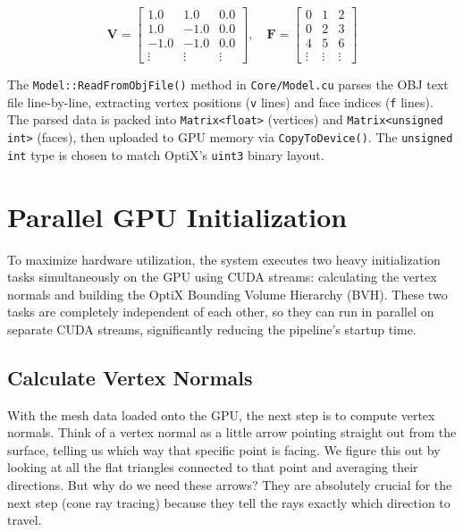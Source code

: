 \begin{equation}
\mathbf{V} = \begin{bmatrix}
1.0 & 1.0 & 0.0 \\
1.0 & -1.0 & 0.0 \\
-1.0 & -1.0 & 0.0 \\
\vdots & \vdots & \vdots
\end{bmatrix}, \quad
\mathbf{F} = \begin{bmatrix}
0 & 1 & 2 \\
0 & 2 & 3 \\
4 & 5 & 6 \\
\vdots & \vdots & \vdots
\end{bmatrix}
\end{equation}

The \texttt{Model::ReadFromObjFile()} method in \texttt{Core/Model.cu} parses the OBJ text file line-by-line, extracting vertex positions (\texttt{v} lines) and face indices (\texttt{f} lines). The parsed data is packed into \texttt{Matrix<float>} (vertices) and \texttt{Matrix<unsigned int>} (faces), then uploaded to GPU memory via \texttt{CopyToDevice()}. The \texttt{unsigned int} type is chosen to match OptiX's \texttt{uint3} binary layout.

\section{Parallel GPU Initialization}

To maximize hardware utilization, the system executes two heavy initialization tasks simultaneously on the GPU using CUDA streams: calculating the vertex normals and building the OptiX Bounding Volume Hierarchy (BVH). These two tasks are completely independent of each other, so they can run in parallel on separate CUDA streams, significantly reducing the pipeline's startup time.

\subsection{Calculate Vertex Normals}

With the mesh data loaded onto the GPU, the next step is to compute vertex normals. Think of a vertex normal as a little arrow pointing straight out from the surface, telling us which way that specific point is facing. We figure this out by looking at all the flat triangles connected to that point and averaging their directions. But why do we need these arrows? They are absolutely crucial for the next step (cone ray tracing) because they tell the rays exactly which direction to travel.

